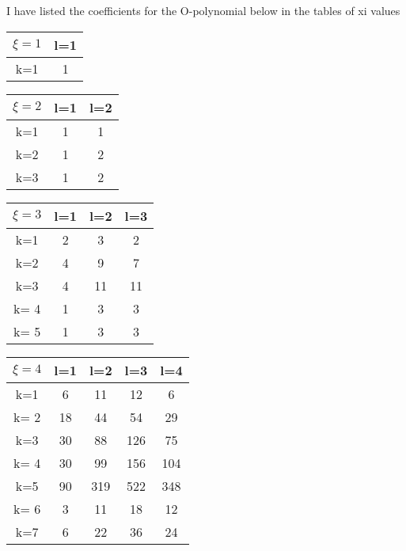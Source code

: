 I have listed the coefficients for the O-polynomial below in the tables of xi values

\begin{table}[h!]
     \centering
     \begin{tabular}{||c| c ||} 
          \hline
          \hline
          \(\xi = 1\) & l=1 \\ [0.5ex] 
          \hline
          k=1 & 1 \\ [1ex] 
          \hline
          \hline
     \end{tabular}
\end{table}

\begin{table}[h!]
     \centering
     \begin{tabular}{||c| c c ||} 
          \hline
          \hline
          \(\xi = 2\) & l=1 & l=2 \\ [0.5ex] 
          \hline
          k=1 &1 & 1 \\
          k=2& 1 & 2 \\
          k=3 &1 & 2 \\ [1ex] 
          \hline
          \hline
     \end{tabular}
\end{table}

\begin{table}[h!]
     \centering
     \begin{tabular}{||c| c c c ||} 
          \hline
          \hline
          \(\xi = 3\) & l=1 & l=2 & l=3 \\ [0.5ex] 
          \hline
          k=1 & 2 & 3 & 2 \\
          k=2 &4 & 9 & 7 \\
          k=3 & 4 & 11 & 11 \\
          k= 4 &1 & 3 & 3 \\
          k= 5 & 1 & 3 & 3 \\ [1ex] 
          \hline
          \hline
     \end{tabular}
\end{table}

\begin{table}[h!]
     \centering
     \begin{tabular}{||c| c c c c ||} 
          \hline
          \hline
          \(\xi = 4\) & l=1 & l=2 & l=3 & l=4 \\ [0.5ex] 
          \hline
          k=1 & 6 & 11 & 12 & 6 \\
          k= 2 & 18 & 44 & 54 & 29 \\
          k=3 & 30 & 88 & 126 & 75 \\
          k= 4 & 30 & 99 & 156 & 104 \\
          k=5 & 90 & 319 & 522 & 348 \\
          k= 6 & 3 & 11 & 18 & 12 \\
          k=7 & 6 & 22 & 36 & 24 \\ [1ex] 
          \hline
          \hline
     \end{tabular}
\end{table}

